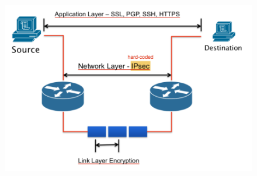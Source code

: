 \documentclass[11pt, a4paper, twoside, italian]{report}
\theoremstyle{plain}
\begin{document}
\begin{figure}[H]
	\centering
	\includegraphics[scale=0.9]{layers}
\end{figure}


\newpage
\end{document}

